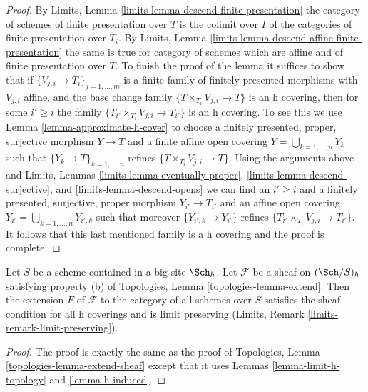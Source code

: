 \begin{proof}
By Limits, Lemma \ref{limits-lemma-descend-finite-presentation}
the category of schemes of finite presentation over $T$ is the
colimit over $I$ of the categories of finite presentation over $T_i$. By
Limits, Lemma \ref{limits-lemma-descend-affine-finite-presentation}
the same is true for category of schemes which are affine and
of finite presentation over $T$.
To finish the proof of the lemma it suffices to show that if
$\{V_{j, i} \to T_i\}_{j = 1, \ldots, m}$ is a finite family of
finitely presented morphisms with $V_{j, i}$ affine, and the
base change family $\{T \times_{T_i} V_{j, i} \to T\}$ is
an h covering, then for some $i' \geq i$ the family
$\{T_{i'} \times_{T_i} V_{j, i} \to T_{i'}\}$ is an h covering.
To see this we use Lemma \ref{lemma-approximate-h-cover} to
choose a finitely presented, proper, surjective
morphism $Y \to T$ and a finite affine open covering
$Y = \bigcup_{k = 1, \ldots, n} Y_k$ such that
$\{Y_k \to T\}_{k = 1, \ldots, n}$ refines
$\{T \times_{T_i} V_{j, i} \to T\}$.
Using the arguments above and
Limits, Lemmas \ref{limits-lemma-eventually-proper},
\ref{limits-lemma-descend-surjective}, and
\ref{limits-lemma-descend-opens}
we can find an $i' \geq i$ and a finitely presented, surjective, proper
morphism $Y_{i'} \to T_{i'}$ and an affine open covering
$Y_{i'} = \bigcup_{k = 1, \ldots, n} Y_{i', k}$
such that moreover $\{Y_{i', k} \to Y_{i'}\}$ refines
$\{T_{i'} \times_{T_i} V_{j, i} \to T_{i'}\}$.
It follows that this last mentioned family is
a h covering and the proof is complete.
\end{proof}

\begin{lemma}
\label{lemma-extend-sheaf-h}
Let $S$ be a scheme contained in a big site $\Sch_h$.
Let $\mathcal{F}$ be a sheaf on $(\Sch/S)_h$ satisfying
property (b) of Topologies, Lemma \ref{topologies-lemma-extend}.
Then the extension $F$ of $\mathcal{F}$ to the category of all
schemes over $S$ satisfies the sheaf condition for all h coverings
and is limit preserving (Limits, Remark \ref{limits-remark-limit-preserving}).
\end{lemma}

\begin{proof}
The proof is exactly the same as the proof of
Topologies, Lemma \ref{topologies-lemma-extend-sheaf}
except that it uses Lemmas \ref{lemma-limit-h-topology} and
\ref{lemma-h-induced}.
\end{proof}








